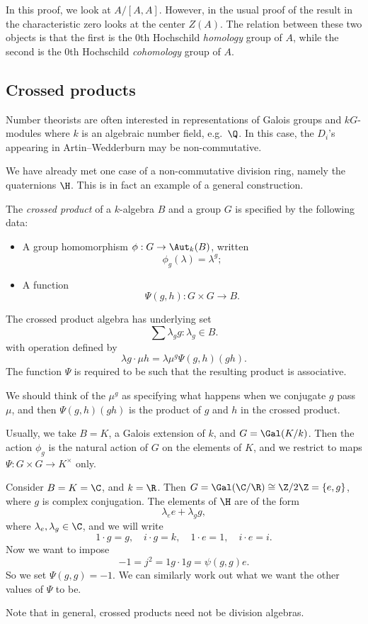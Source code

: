 \documentclass[a4paper]{article}
\begin{document}
In this proof, we look at $A/[A, A]$. However, in the usual proof of the result in the characteristic zero looks at the center $Z(A)$. The relation between these two objects is that the first is the $0$th Hochschild \emph{homology} group of $A$, while the second is the $0$th Hochschild \emph{cohomology} group of $A$.

\subsection{Crossed products}
Number theorists are often interested in representations of Galois groups and $kG$-modules where $k$ is an algebraic number field, e.g.\ $\Q$. In this case, the $D_i$'s appearing in Artin--Wedderburn may be non-commutative.

We have already met one case of a non-commutative division ring, namely the quaternions $\H$. This is in fact an example of a general construction.

\begin{defi}
  The \emph{crossed product} of a $k$-algebra $B$ and a group $G$ is specified by the following data:
  \begin{itemize}
    \item A group homomorphism $\phi: G \to \Aut_k(B)$, written
      \[
        \phi_g(\lambda) = \lambda^g;
      \]
    \item A function
      \[
        \Psi(g, h): G \times G \to B.
      \]
  \end{itemize}
  The crossed product algebra has underlying set
  \[
    \sum \lambda_g g: \lambda_g \in B.
  \]
  with operation defined by
  \[
    \lambda g \cdot \mu h = \lambda \mu^g \Psi(g, h) (gh).
  \]
  The function $\Psi$ is required to be such that the resulting product is associative.
\end{defi}
We should think of the $\mu^g$ as specifying what happens when we conjugate $g$ pass $\mu$, and then $\Psi(g, h) (gh)$ is the product of $g$ and $h$ in the crossed product.

Usually, we take $B = K$, a Galois extension of $k$, and $G = \Gal(K/k)$. Then the action $\phi_g$ is the natural action of $G$ on the elements of $K$, and we restrict to maps $\Psi: G \times G \to K^\times$ only.

\begin{eg}
  Consider $B = K = \C$, and $k = \R$. Then $G = \Gal(\C/\R) \cong \Z/2\Z = \{e, g\}$, where $g$ is complex conjugation. The elements of $\H$ are of the form
  \[
    \lambda_e e + \lambda_g g,
  \]
  where $\lambda_e, \lambda_g \in \C$, and we will write
  \[
    1 \cdot g = g,\quad i \cdot g = k,\quad 1 \cdot e = 1,\quad i \cdot e = i.
  \]
  Now we want to impose
  \[
    -1 = j^2 = 1g \cdot 1g = \psi(g, g) e.
  \]
  So we set $\Psi(g, g) = -1$. We can similarly work out what we want the other values of $\Psi$ to be. %
\end{eg}
Note that in general, crossed products need not be division algebras.
\end{document}

